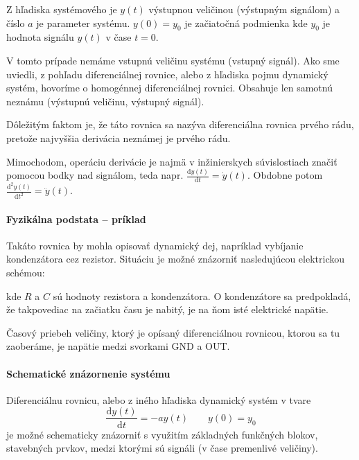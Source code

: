 \documentclass[a4paper, 10pt, ]{article}
\begin{document}
Z hľadiska systémového je $y(t)$ výstupnou veličinou (výstupným signálom) a číslo $a$ je parameter systému. $y(0)=y_0$ je začiatočná podmienka kde $y_0$ je hodnota signálu $y(t)$ v čase $t=0$.

V tomto prípade nemáme vstupnú veličinu systému (vstupný signál). Ako sme uviedli, z pohľadu diferenciálnej rovnice, alebo z hľadiska pojmu dynamický systém, hovoríme o homogénnej diferenciálnej rovnici. Obsahuje len samotnú neznámu (výstupnú veličinu, výstupný signál).

Dôležitým faktom je, že táto rovnica sa nazýva diferenciálna rovnica prvého rádu, pretože najvyššia derivácia neznámej je prvého rádu.


Mimochodom, operáciu derivácie je najmä v inžinierskych súvislostiach značiť pomocou bodky nad signálom, teda napr. $\frac{\text{d}y(t)}{\text{d}t} = \dot y(t)$. Obdobne potom $\frac{\text{d}^2y(t)}{\text{d}t^2} = \ddot y(t)$.


\paragraph{Fyzikálna podstata -- príklad}

Takáto rovnica by mohla opisovať dynamický dej, napríklad vybíjanie kondenzátora cez rezistor. Situáciu je možné znázorniť nasledujúcou elektrickou schémou:


\begin{center}

	\makebox[\textwidth][c]{%
	
	}

	\label{RCclanok_v2}

\end{center}

\noindent
kde $R$ a $C$ sú hodnoty rezistora a kondenzátora. O kondenzátore sa predpokladá, že takpovediac na začiatku času je nabitý, je na ňom isté elektrické napätie.

Časový priebeh veličiny, ktorý je opísaný diferenciálnou rovnicou, ktorou sa tu zaoberáme, je napätie medzi svorkami \textsf{GND} a \textsf{OUT}.



\paragraph{Schematické znázornenie systému}


Diferenciálnu rovnicu, alebo z iného hľadiska dynamický systém v tvare
\begin{equation}  \label{hodrpr01_2}
    \frac{\text{d}y(t)}{\text{d}t} = - a y(t) \qquad y(0)=y_0
\end{equation}
je možné schematicky znázorniť s využitím základných funkčných blokov, stavebných prvkov, medzi ktorými sú signáli (v čase premenlivé veličiny).
\end{document}
